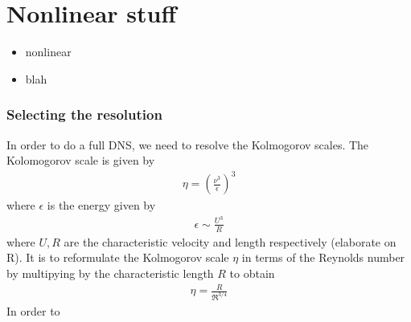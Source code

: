 %
% 
%
%
%
%
%
%
%
%
%
%
%
%
%
%
\chapter{Nonlinear stuff}

\begin{itemize}
\item nonlinear 
\item blah
\end{itemize}

\subsection{Selecting the resolution}

In order to do a full DNS, we need to resolve the Kolmogorov scales. The Kolomogorov scale is given by
\begin{align}
\eta = \left(\frac{\nu^{3}}{\epsilon}\right)^{3}
\end{align}
where $\epsilon$ is the energy given by
\begin{align}
\epsilon \sim \frac{U^{3}}{R} 
\end{align}
where $U,R$ are the characteristic velocity and length respectively (elaborate on R). It is to reformulate the Kolmogorov scale $\eta$ in terms of the Reynolds number by multipying by the characteristic length  $R$ to obtain
\begin{align}
\eta = \frac{R}{\Re^{3/4}}
\end{align}
In order to 
